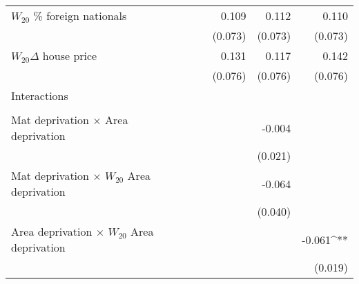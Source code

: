 \begin{center}
\begin{scriptsize}
\begin{ThreePartTable}
\begin{longtable}{l D{.}{.}{6.6} D{.}{.}{6.6} D{.}{.}{6.6} D{.}{.}{6.6} D{.}{.}{6.6}}
\quad $W_{20}$ \% foreign nationals                       &                         &                         & 0.109                   & 0.112                   & 0.110                   \\
                                                          &                         &                         & (0.073)                 & (0.073)                 & (0.073)                 \\
\quad $W_{20} \Delta$ house price                         &                         &                         & 0.131                   & 0.117                   & 0.142                   \\
                                                          &                         &                         & (0.076)                 & (0.076)                 & (0.076)                 \\
Interactions                                              &                         &                         &                         &                         &                         \\
                                                          &                         &                         &                         &                         &                         \\
\quad Mat deprivation $\times$ Area deprivation           &                         &                         &                         & -0.004                  &                         \\
                                                          &                         &                         &                         & (0.021)                 &                         \\
\quad Mat deprivation $\times$ $W_{20}$ Area deprivation  &                         &                         &                         & -0.064                  &                         \\
                                                          &                         &                         &                         & (0.040)                 &                         \\
\quad Area deprivation $\times$ $W_{20}$ Area deprivation &                         &                         &                         &                         & -0.061^{**}             \\
                                                          &                         &                         &                         &                         & (0.019)                 \\

\end{longtable}
\end{ThreePartTable}
\end{scriptsize}
\end{center}
